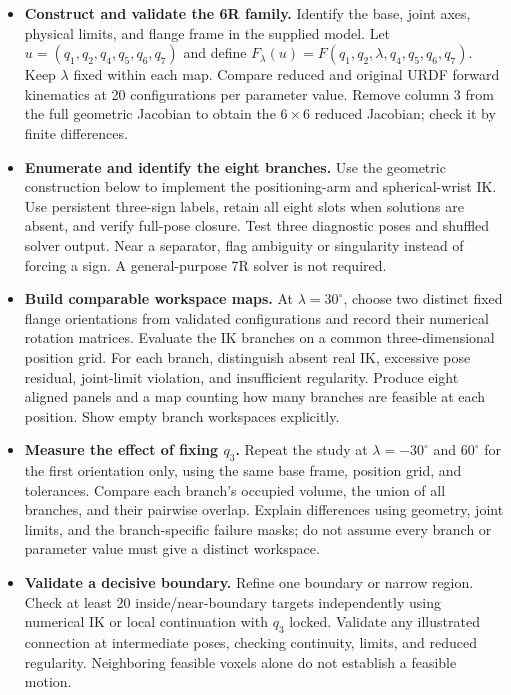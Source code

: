 \documentclass[11pt,a4paper]{article}
\begin{document}
\begin{itemize}
  \item \textbf{Construct and validate the 6R family.} Identify the base, joint
axes, physical limits, and flange frame in the supplied model.
Let $u=(q_1,q_2,q_4,q_5,q_6,q_7)$ and define
$F_\lambda(u)=F(q_1,q_2,\lambda,q_4,q_5,q_6,q_7)$.
Keep $\lambda$ fixed within each map. Compare reduced and original URDF
forward kinematics at 20 configurations per parameter value. Remove column 3
from the full geometric Jacobian to obtain the $6\times6$ reduced Jacobian;
check it by finite differences.

  \item \textbf{Enumerate and identify the eight branches.} Use the geometric
construction below to implement the positioning-arm and spherical-wrist IK.
Use persistent three-sign labels, retain all eight slots when solutions are
absent, and verify full-pose closure. Test three diagnostic poses and shuffled
solver output. Near a separator, flag ambiguity or singularity instead of
forcing a sign. A general-purpose 7R solver is not required.

  \item \textbf{Build comparable workspace maps.} At $\lambda=30^\circ$, choose
two distinct fixed flange orientations from validated configurations and
record their numerical rotation matrices. Evaluate the IK branches on a
common three-dimensional position grid. For each branch, distinguish absent
real IK, excessive pose residual, joint-limit violation, and insufficient
regularity. Produce eight aligned panels and a map counting how many
branches are feasible at each position. Show empty branch workspaces explicitly.

  \item \textbf{Measure the effect of fixing $q_3$.} Repeat the study at
$\lambda=-30^\circ$ and $60^\circ$ for the first orientation only, using the
same base frame, position grid, and tolerances. Compare each branch's occupied
volume, the union of all branches, and their pairwise overlap. Explain
differences using geometry, joint limits, and the branch-specific failure masks;
do not assume every branch or parameter value must give a distinct workspace.

  \item \textbf{Validate a decisive boundary.} Refine one boundary or narrow
region. Check at least 20 inside/near-boundary targets independently using
numerical IK or local continuation with $q_3$ locked. Validate any illustrated
connection at intermediate poses, checking continuity, limits, and reduced
regularity. Neighboring feasible voxels alone do not establish a feasible motion.
\end{itemize}
\end{document}
